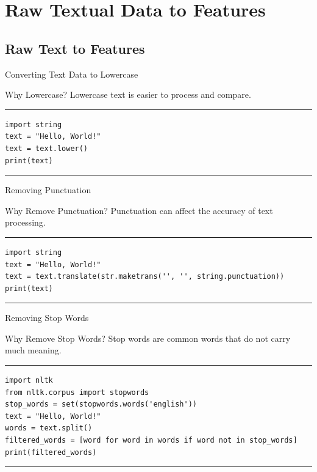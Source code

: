 \documentclass[aspectratio=169, hideothersubsections]{beamer}
\begin{document}
\section{Raw Textual Data to Features}

\subsection{Raw Text to Features}

\begin{frame}[fragile]{Converting Text Data to Lowercase}
  \begin{block}{Why Lowercase?}
    Lowercase text is easier to process and compare.
  \end{block}
\rule{\textwidth}{1pt}
\scriptsize
\begin{verbatim}
import string
text = "Hello, World!"
text = text.lower()
print(text)
\end{verbatim}
\rule{\textwidth}{1pt}
\end{frame}

\begin{frame}[fragile]{Removing Punctuation}
  \begin{block}{Why Remove Punctuation?}
    Punctuation can affect the accuracy of text processing.
  \end{block}
\rule{\textwidth}{1pt}
\scriptsize
\begin{verbatim}
import string
text = "Hello, World!"
text = text.translate(str.maketrans('', '', string.punctuation))
print(text)
\end{verbatim}
\rule{\textwidth}{1pt}
\end{frame}

\begin{frame}[fragile]{Removing Stop Words}
  \begin{block}{Why Remove Stop Words?}
    Stop words are common words that do not carry much meaning.
  \end{block}
\rule{\textwidth}{1pt}
\scriptsize
\begin{verbatim}
import nltk
from nltk.corpus import stopwords
stop_words = set(stopwords.words('english'))
text = "Hello, World!"
words = text.split()
filtered_words = [word for word in words if word not in stop_words]
print(filtered_words)
\end{verbatim}
\rule{\textwidth}{1pt}
\end{frame}
\end{document}
